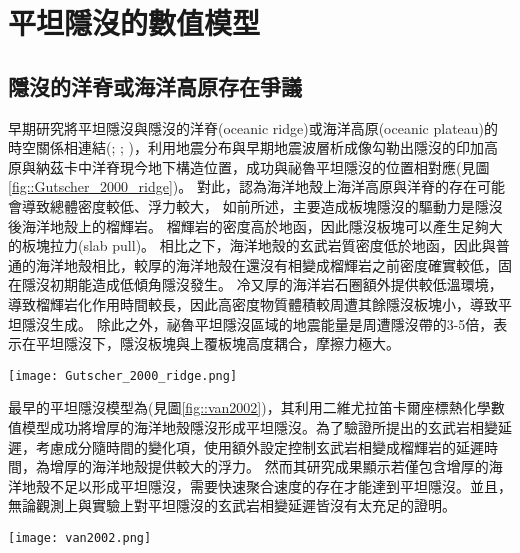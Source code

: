 \section{平坦隱沒的數值模型}
\subsection{隱沒的洋脊或海洋高原存在爭議}
早期研究將平坦隱沒與隱沒的洋脊(oceanic ridge)或海洋高原(oceanic plateau)的時空關係相連結(\citealp{pilger1981plate}; \citealp{henderson1984mesozoic}; \citealp{Gutscher2000A})，\citealp{Gutscher2000A}利用地震分布與早期地震波層析成像勾勒出隱沒的印加高原與納茲卡中洋脊現今地下構造位置，成功與祕魯平坦隱沒的位置相對應(見圖\ref{fig::Gutscher_2000_ridge})。
對此，\citealp{Gutscher2000A}認為海洋地殼上海洋高原與洋脊的存在可能會導致總體密度較低、浮力較大，
如前所述，主要造成板塊隱沒的驅動力是隱沒後海洋地殼上的榴輝岩。
榴輝岩的密度高於地函，因此隱沒板塊可以產生足夠大的板塊拉力(slab pull)。
相比之下，海洋地殼的玄武岩質密度低於地函，因此與普通的海洋地殼相比，較厚的海洋地殼在還沒有相變成榴輝岩之前密度確實較低，固在隱沒初期能造成低傾角隱沒發生。
冷又厚的海洋岩石圈額外提供較低溫環境，導致榴輝岩化作用時間較長，因此高密度物質體積較周遭其餘隱沒板塊小，導致平坦隱沒生成。
除此之外，祕魯平坦隱沒區域的地震能量是周遭隱沒帶的3-5倍，表示在平坦隱沒下，隱沒板塊與上覆板塊高度耦合，摩擦力極大。
\begin{figure*}[ht!]
    \centering
    \texttt{[image: Gutscher\_2000\_ridge.png]}
    \caption{南美洲板塊構造圖，摘自\citealp{Gutscher2000A}。粗黑線標出平坦隱沒段，灰色陰影區標示隱沒的海洋高原與洋脊，三角形為活動火山。板塊聚合速率參考自\citealp{demets1990current}。
    }
    \label{fig::Gutscher_2000_ridge}
\end{figure*}

最早的平坦隱沒模型為\citealp{van2002role}(見圖\ref{fig::van2002})，其利用二維尤拉笛卡爾座標熱化學數值模型成功將增厚的海洋地殼隱沒形成平坦隱沒。為了驗證\citealp{Gutscher2000A}所提出的玄武岩相變延遲，\citealp{van2002role}考慮成分隨時間的變化項，使用額外設定控制玄武岩相變成榴輝岩的延遲時間，為增厚的海洋地殼提供較大的浮力。
然而其研究成果顯示若僅包含增厚的海洋地殼不足以形成平坦隱沒，需要快速聚合速度的存在才能達到平坦隱沒。並且，無論觀測上與實驗上對平坦隱沒的玄武岩相變延遲皆沒有太充足的證明。

\begin{figure*}[ht!]
    \centering
    \texttt{[image: van2002.png]}
    \caption{正常的隱沒帶(左)與包含海洋高原的隱沒帶(右)隨模型時間變化，摘自\citealp{van2002role}。黑白區域繪出海洋地殼的化學成分從玄武岩(黑)到榴輝岩(白)的變化。水平軸為與海溝的距離，背景顏色為溫度。
    }
    \label{fig::van2002}
\end{figure*}

